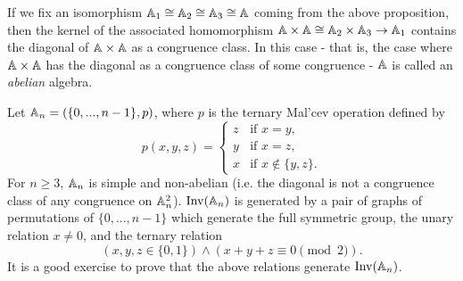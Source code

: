 \documentclass[letterpaper,11pt]{article}
\DeclareMathOperator{\Inv}{Inv}
\begin{document}
If we fix an isomorphism $\mathbb{A}_1 \cong \mathbb{A}_2 \cong \mathbb{A}_3 \cong \mathbb{A}$ coming from the above proposition, then the kernel of the associated homomorphism $\mathbb{A} \times \mathbb{A} \cong \mathbb{A}_2\times \mathbb{A}_3 \rightarrow \mathbb{A}_1$ contains the diagonal of $\mathbb{A}\times \mathbb{A}$ as a congruence class. In this case - that is, the case where $\mathbb{A}\times\mathbb{A}$ has the diagonal as a congruence class  of some congruence - $\mathbb{A}$ is called an \emph{abelian} algebra.%


\begin{ex}\label{ex-simple-nonab-malcev} Let $\mathbb{A}_n = (\{0, ..., n-1\}, p)$, where $p$ is the ternary Mal'cev operation defined by
\[
p(x,y,z) = \begin{cases}z & \text{if }x=y,\\ y & \text{if }x=z,\\ x & \text{if } x\not\in\{y,z\}.\end{cases}
\]
For $n \ge 3$, $\mathbb{A}_n$ is simple and non-abelian (i.e.\! the diagonal is not a congruence class of any congruence on $\mathbb{A}_n^2$). $\Inv(\bA_n)$ is generated by a pair of graphs of permutations of $\{0,...,n-1\}$ which generate the full symmetric group, the unary relation $x \ne 0$, and the ternary relation
\[
(x,y,z \in \{0,1\}) \wedge (x+y+z \equiv 0\!\!\!\pmod{2}).
\]
It is a good exercise to prove that the above relations generate $\Inv(\bA_n)$.
\end{ex}
\end{document}
